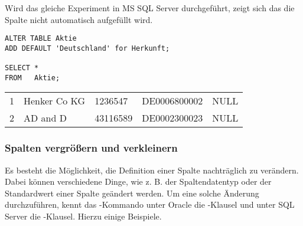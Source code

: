 Wird das gleiche Experiment in MS SQL Server durchgeführt, zeigt sich das die Spalte  nicht automatisch aufgefüllt wird.
\begin{lstlisting}[language=ms_sql,caption={Tabellenspalte mit Standardwert hinzufügen in SQL Server},label=sql08_10]
ALTER TABLE Aktie
ADD DEFAULT 'Deutschland' for Herkunft;

SELECT *
FROM   Aktie;
          \end{lstlisting}
\clearpage
\begin{center}
    \begin{small}
        \tablehead{}
        \begin{oraclesql}
            \begin{supertabular}{lllll}
                1 & Henker Co KG & 1236547 & DE0006800002 &  NULL \\
                2 & AD and D & 43116589 & DE0002300023 & NULL \\
            \end{supertabular}
        \end{oraclesql}
    \end{small}
\end{center}
\subsubsection{Spalten vergrößern und verkleinern}
Es besteht die Möglichkeit, die Definition einer Spalte nachträglich zu verändern. Dabei können verschiedene Dinge, wie z. B. der Spaltendatentyp oder der Standardwert einer Spalte geändert werden. Um eine solche Änderung durchzuführen, kennt das -Kommando unter Oracle die -Klausel und unter SQL Server die -Klausel. Hierzu einige Beispiele.

